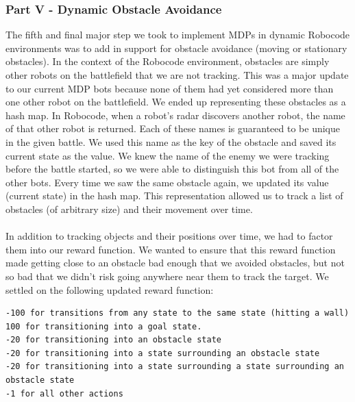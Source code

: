 \documentclass{aiaa-tc}%
\begin{document}
\subsubsection{Part V - Dynamic Obstacle Avoidance}
The fifth and final major step we took to implement MDPs in dynamic Robocode environments was to add in support for obstacle avoidance (moving or stationary obstacles). In the context of the Robocode environment, obstacles are simply other robots on the battlefield that we are not tracking. This was a major update to our current MDP bots because none of them had yet considered more than one other robot on the battlefield. We ended up representing these obstacles as a hash map. In Robocode, when a robot's radar discovers another robot, the name of that other robot is returned. Each of these names is guaranteed to be unique in the given battle. We used this name as the key of the obstacle and saved its current state as the value. We knew the name of the enemy we were tracking before the battle started, so we were able to distinguish this bot from all of the other bots. Every time we saw the same obstacle again, we updated its value (current state) in the hash map. This representation allowed us to track a list of obstacles (of arbitrary size) and their movement over time.  \\ \\
In addition to tracking objects and their positions over time, we had to factor them into our reward function. We wanted to ensure that this reward function made getting close to an obstacle bad enough that we avoided obstacles, but not so bad that we didn't risk going anywhere near them to track the target. We settled on the following updated reward function: 
\begin{verbatim}
-100 for transitions from any state to the same state (hitting a wall)
100 for transitioning into a goal state.
-20 for transitioning into an obstacle state
-20 for transitioning into a state surrounding an obstacle state
-20 for transitioning into a state surrounding a state surrounding an obstacle state
-1 for all other actions	
\end{verbatim}
\end{document}

